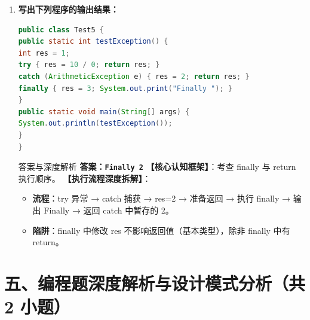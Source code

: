 ﻿\documentclass[12pt, a4paper]{ctexart}
\newcommand{\code}[1]{\texttt{#1}}
\begin{document}
\begin{enumerate}[label=\textbf{\arabic*.}, leftmargin=*, itemsep=1.5em]
	\item \textbf{写出下列程序的输出结果：}
	      \begin{lstlisting}[language=Java]
public class Test5 {
public static int testException() {
int res = 1;
try { res = 10 / 0; return res; } 
catch (ArithmeticException e) { res = 2; return res; } 
finally { res = 3; System.out.print("Finally "); }
}
public static void main(String[] args) {
System.out.println(testException());
}
}
\end{lstlisting}
	      \begin{bluebox}{答案与深度解析}
		      \textbf{答案：\code{Finally 2}}
		      \textbf{【核心认知框架】}：考查 finally 与 return 执行顺序。
		      \textbf{【执行流程深度拆解】}：
		      \begin{itemize}[leftmargin=*, nosep]
			      \item \textbf{流程}：try 异常 → catch 捕获 → res=2 → 准备返回 → 执行 finally → 输出 Finally → 返回 catch 中暂存的 2。
			      \item \textbf{陷阱}：finally 中修改 res 不影响返回值（基本类型），除非 finally 中有 return。
		      \end{itemize}
	      \end{bluebox}
\end{enumerate}

\section*{五、编程题深度解析与设计模式分析（共 2 小题）}
\end{document}
